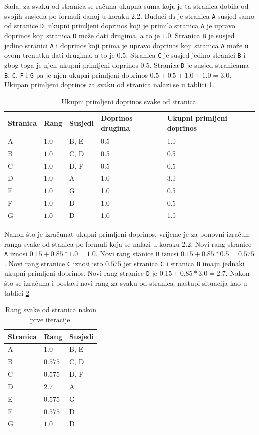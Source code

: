 \documentclass[times, utf8, zavrsni, numeric]{fer}
\begin{document}
Sada, za svaku od stranica se računa ukupna suma koju je ta stranica dobila od svojih susjeda po formuli danoj u koraku 2.2.
Budući da je stranica \texttt{A} susjed samo od stranice \texttt{D}, ukupni primljeni doprinos koji je primila stranica \texttt{A} je upravo doprinos koji stranica \texttt{D} može dati drugima, a to je $1.0$. Stranica \texttt{B} je susjed jedino stranici \texttt{A} i doprinos koji prima je upravo doprinos koji stranica \texttt{A} može u ovom trenutku dati drugima, a to je $0.5$. Stranica \texttt{C} je susjed jedino stranici \texttt{B} i zbog toga je njen ukupni primljeni doprinos $0.5$. Stranica \texttt{D} je susjed stranicama \texttt{B}, \texttt{C}, \texttt{F} i \texttt{G} pa je njen ukupni primljeni doprinos $0.5 + 0.5 + 1.0 + 1.0 = 3.0$. Ukupan primljeni doprinos za svaku od stranica nalazi se u tablici \ref{tbl:pageRankKorak22ap1}.

\begin{table}[htb]
\caption{Ukupni primljeni doprinos svake od stranica.}
\label{tbl:pageRankKorak22ap1}
\centering
\begin{tabular}{lllll} 
\hline
Stranica & Rang & Susjedi & Doprinos drugima & Ukupni primljeni doprinos\\
\hline
A & $1.0$ & B, E & 0.5 & 1.0\\
B & $1.0$ & C, D & 0.5 & 0.5\\
C & $1.0$ & D, F & 0.5 & 0.5\\
D & $1.0$ & A & 1.0 & 3.0\\
E & $1.0$ & G & 1.0 & 0.5\\
F & $1.0$ & D & 1.0 & 0.5\\
G & $1.0$ & D & 1.0 & 1.0\\
\hline
\end{tabular}
\end{table}

Nakon što je izračunat ukupni primljeni doprinos, vrijeme je za ponovni izračun ranga svake od stanica po formuli koja se nalazi u koraku 2.2. Novi rang stranice \texttt{A} iznosi $0.15 + 0.85 * 1.0 = 1.0$. Novi rang stanice \texttt{B} iznosi $0.15 + 0.85 * 0.5 = 0.575$. Novi rang stranice \texttt{C} iznosi isto $0.575$ jer stranica \texttt{C} i stranica \texttt{B} imaju jednaki ukupni primljeni doprinos. Novi rang stranice \texttt{D} je $0.15 + 0.85 * 3.0 = 2.7$. Nakon što se izračuna i postavi novi rang za svaku od stranica, nastupi situacija kao u tablici \ref{tbl:pageRankStanje1}

\begin{table}[htb]
\caption{Rang svake od stranica nakon prve iteracije.}
\label{tbl:pageRankStanje1}
\centering
\begin{tabular}{lll} 
\hline
Stranica & Rang & Susjedi \\
\hline
A & $1.0$ & B, E\\
B & $0.575$ & C, D\\
C & $0.575$ & D, F\\
D & $2.7$ & A\\
E & $0.575$ & G\\
F & $0.575$ & D\\
G & $1.0$ & D\\
\hline
\end{tabular}
\end{table}
\end{document}
